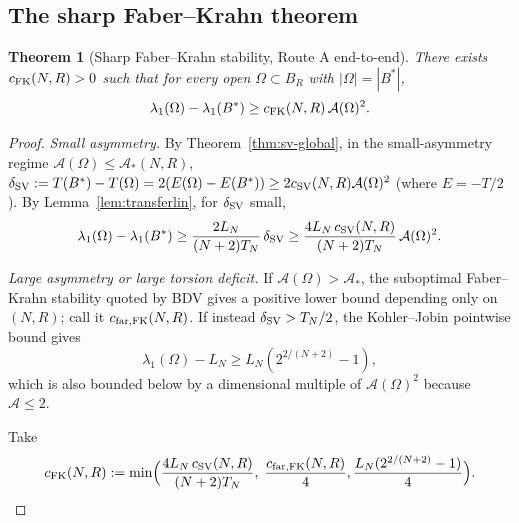 \documentclass[11pt]{amsart}
\newtheorem{theorem}{Theorem}[section]
\theoremstyle{definition}
\newcommand{\abs}[1]{\left|#1\right|}
\begin{document}
\subsection{The sharp Faber--Krahn theorem}\label{sec:final}

\begin{theorem}[Sharp Faber--Krahn stability, Route A end-to-end]\label{thm:fk-final}
There exists $c_{\rm FK}(N,R)>0$ such that for every open
$\Omega\subset B_R$ with $\abs{\Omega}=\abs{B^*}$,
\[
\lambda_1(\Omega)-\lambda_1(B^*)\ge c_{\rm FK}(N,R)\,\mathcal A(\Omega)^2.
\]
\end{theorem}

\begin{proof}
\emph{Small asymmetry.} By Theorem~\ref{thm:sv-global}, in the small-asymmetry
regime $\mathcal A(\Omega)\le\mathcal A_*(N,R)$,
$\delta_{\rm SV}:=T(B^*)-T(\Omega)=2(E(\Omega)-E(B^*))
\ge 2c_{\rm SV}(N,R)\mathcal A(\Omega)^2$
(where $E=-T/2$). By Lemma~\ref{lem:transferlin}, for $\delta_{\rm SV}$ small,
\[
\lambda_1(\Omega)-\lambda_1(B^*)\ge\frac{2L_N}{(N+2)T_N}\,\delta_{\rm SV}
\ge\frac{4L_N\,c_{\rm SV}(N,R)}{(N+2)T_N}\,\mathcal A(\Omega)^2.
\]

\emph{Large asymmetry or large torsion deficit.} If
$\mathcal A(\Omega)>\mathcal A_*$, the suboptimal Faber--Krahn stability
quoted by BDV gives a positive lower bound depending only on $(N,R)$; call it
$c_{\rm far,FK}(N,R)$. If instead $\delta_{\rm SV}>T_N/2$, the Kohler--Jobin
pointwise bound gives
\[
\lambda_1(\Omega)-L_N\ge L_N(2^{2/(N+2)}-1),
\]
which is also bounded below by a dimensional multiple of
$\mathcal A(\Omega)^2$ because $\mathcal A\le2$.

Take
\[
c_{\rm FK}(N,R):=\min\Bigl(\frac{4L_N\,c_{\rm SV}(N,R)}{(N+2)T_N},\;\frac{c_{\rm far,FK}(N,R)}{4},
\frac{L_N(2^{2/(N+2)}-1)}{4}\Bigr).
\]
\end{proof}
\end{document}
